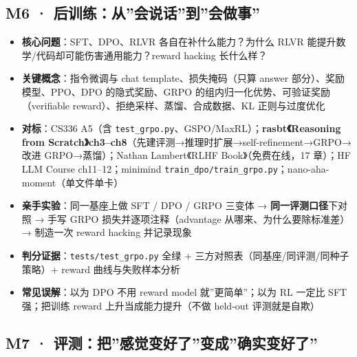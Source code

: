 \documentclass[
  chinese,
  11pt,
]{ctexart}
\providecommand{\tightlist}{%
  \setlength{\itemsep}{0pt}\setlength{\parskip}{0pt}}
\begin{document}
\subsection{M6 · 后训练：从''会说话''到''会做事''}\label{m6-ux540eux8badux7ec3ux4eceux4f1aux8bf4ux8bddux5230ux4f1aux505aux4e8b}

\begin{itemize}
\tightlist
\item
  \textbf{核心问题}：SFT、DPO、RLVR 各自在补什么能力？为什么 RLVR 能提升数学/代码却可能伤害通用能力？reward hacking 长什么样？
\item
  \textbf{关键概念}：指令微调与 chat template、损失掩码（只算 answer 部分）、奖励模型、PPO、DPO 的隐式奖励、GRPO 的组内归一化优势、可验证奖励（verifiable reward）、拒绝采样、蒸馏、合成数据、KL 正则与过度优化
\item
  \textbf{对标}：CS336 A5（含 \texttt{test\_grpo.py}、GSPO/MaxRL）；\textbf{rasbt《Reasoning from Scratch》ch3--ch8}（先建评测→推理时扩展→self-refinement→GRPO→改进 GRPO→蒸馏）；Nathan Lambert《RLHF Book》（免费在线，17 章）；HF LLM Course ch11--12；minimind \texttt{train\_dpo/train\_grpo.py}；nano-aha-moment（单文件单卡）
\item
  \textbf{亲手实验}：同一基座上做 SFT / DPO / GRPO 三变体 → \textbf{同一评测口径}下对照 → 手写 GRPO 损失并逐项注释（advantage 从哪来、为什么要除标准差）→ 制造一次 reward hacking 并记录现象
\item
  \textbf{判分证据}：\texttt{tests/test\_grpo.py} 全绿 + 三方对照表（同基座/同评测/同种子策略）+ reward 曲线与失败样本分析
\item
  \textbf{常见误解}：以为 DPO 不用 reward model 就''更简单''；以为 RL 一定比 SFT 强；把训练 reward 上升当成能力提升（不做 held-out 评测就是自欺）
\end{itemize}

\subsection{M7 · 评测：把''感觉变好了''变成''确实变好了''}\label{m7-ux8bc4ux6d4bux628aux611fux89c9ux53d8ux597dux4e86ux53d8ux6210ux786eux5b9eux53d8ux597dux4e86}
\end{document}
